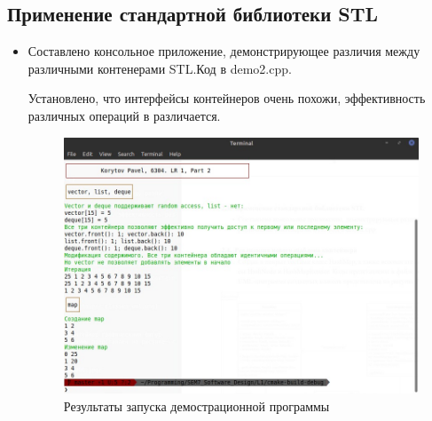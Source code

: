\documentclass[a4paper, 14pt]{extarticle}
\begin{document}
\subsection{Применение стандартной библиотеки STL}
\begin{itemize}
    \item Составлено консольное приложение, демонстрирующее различия между различными контенерами STL.\@ Код в demo2.cpp.
    
        Установлено, что интерфейсы контейнеров очень похожи, эффективность различных операций в различается.~\cite{shlee}~\cite{cppref}

    \begin{figure}[h]
        \centering
        \includegraphics[width=\textwidth]{./img/S010.jpg}
        \caption{Результаты запуска демострационной программы}%
        \label{img:stl:demo}
    \end{figure}


\end{itemize}
\end{document}
